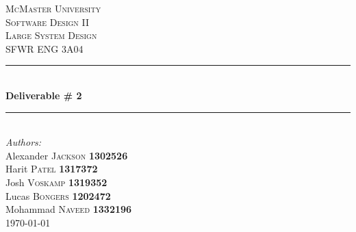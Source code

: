 \documentclass[]{article}
\begin{document}
\cleardoublepage
{}
\begin{titlepage}
	\newcommand{\HRule}{\rule{\linewidth}{0.5mm}} %
	\center %


	\textsc{\LARGE McMaster University}\\[1.5cm] %
	\textsc{\Large Software Design II \\  \Large Large System Design}\\[0.5cm] %
	\textsc{\large SFWR ENG 3A04}\\[0.5cm] %


	\HRule \\[0.4cm]
	{ \huge \bfseries Deliverable \# 2}\\[0.4cm] %
	\HRule \\[1.5cm]


	\Large \emph{Authors:}\\
	Alexander \textsc{Jackson} \textbf{1302526} \\
	Harit \textsc{Patel} \textbf{1317372} \\ %
	Josh \textsc{Voskamp} \textbf{1319352} \\
	Lucas \textsc{Bongers} \textbf{1202472} \\
	Mohammad \textsc{Naveed} \textbf{1332196} \\[3cm]

	{\large \today}\\[3cm] %

	\vfill %

\end{titlepage}
\end{document}
